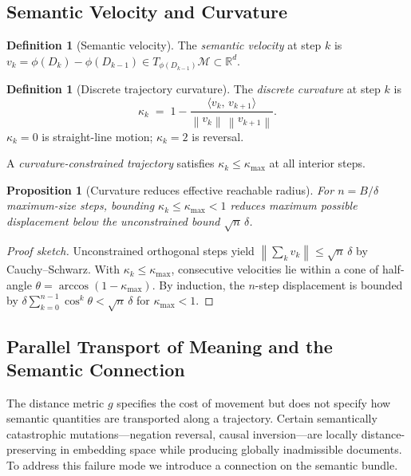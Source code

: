 \documentclass[12pt, a4paper]{article}
\theoremstyle{plain}
\newtheorem{proposition}[theorem]{Proposition}
\theoremstyle{definition}
\newtheorem{definition}[theorem]{Definition}
\theoremstyle{remark}
\newcommand{\calM}{\mathcal{M}}
\newcommand{\bR}{\mathbb{R}}
\newcommand{\norm}[1]{\left\lVert #1 \right\rVert}
\newcommand{\inner}[2]{\langle #1,\, #2 \rangle}
\begin{document}
\subsection{Semantic Velocity and Curvature}

\begin{definition}[Semantic velocity]
\label{def:velocity}
The \emph{semantic velocity} at step $k$ is
$v_k = \phi(D_k) - \phi(D_{k-1}) \in T_{\phi(D_{k-1})}\calM \subset \bR^d$.
\end{definition}

\begin{definition}[Discrete trajectory curvature]
\label{def:curvature}
The \emph{discrete curvature} at step $k$ is
\[
   \kappa_k \;=\; 1 - \frac{\inner{v_k}{v_{k+1}}}{\norm{v_k}\,\norm{v_{k+1}}}.
\]
$\kappa_k = 0$ is straight-line motion; $\kappa_k = 2$ is reversal.
\end{definition}

A \emph{curvature-constrained trajectory} satisfies $\kappa_k \le \kappa_{\max}$
at all interior steps.

\begin{proposition}[Curvature reduces effective reachable radius]
\label{prop:curvature}
For $n = B/\delta$ maximum-size steps, bounding $\kappa_k \le \kappa_{\max} < 1$
reduces maximum possible displacement below the unconstrained bound $\sqrt{n}\,\delta$.
\end{proposition}

\begin{proof}[Proof sketch]
Unconstrained orthogonal steps yield $\norm{\sum_k v_k} \le \sqrt{n}\,\delta$
by Cauchy--Schwarz.  With $\kappa_k \le \kappa_{\max}$, consecutive velocities
lie within a cone of half-angle $\theta = \arccos(1-\kappa_{\max})$.  By
induction, the $n$-step displacement is bounded by
$\delta \sum_{k=0}^{n-1} \cos^k\!\theta < \sqrt{n}\,\delta$ for $\kappa_{\max} < 1$.
\end{proof}

\subsection{Parallel Transport of Meaning and the Semantic Connection}

The distance metric $g$ specifies the cost of movement but does not specify
how semantic quantities are transported along a trajectory.  Certain
semantically catastrophic mutations---negation reversal, causal inversion---are
locally distance-preserving in embedding space while producing globally
inadmissible documents.  To address this failure mode we introduce a connection
on the semantic bundle.
\end{document}
